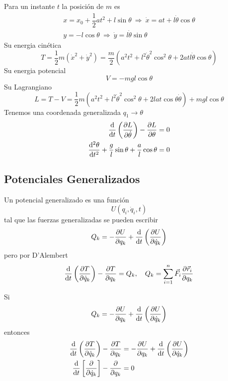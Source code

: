 \documentclass[../main]{subfiles}
\begin{document}
Para un instante $t$ la posición de $m$ es
\begin{align*}
    x=x_0+\dfrac{1}{2}at^2+l\sin \theta \ \Rightarrow \ \dot{x}=at+l\dot{\theta}\cos \theta \\
    y=-l\cos \theta \ \Rightarrow \ \dot{y}=l\dot{\theta}\sin \theta
\end{align*}
Su energia cinética
\begin{equation*}
    T=\dfrac{1}{2}m(\dot{x}^2+\dot{y}^2)=\dfrac{m}{2}(a^2t^2+l^2\dot{\theta}^2\cos^2 \theta+2atl\dot{\theta}\cos \theta)
\end{equation*}
Su energia potencial
\begin{equation*}
    V=-mgl\cos \theta
\end{equation*}
Su Lagrangiano
\begin{equation*}
    L=T-V=\dfrac{1}{2}m(a^2t^2+l^2\dot{\theta}^2\cos^2 \theta+2lat\cos \theta \dot{\theta})+mgl\cos \theta
\end{equation*}
Tenemos una coordenada generalizada $q_1 \rightarrow \theta$
\begin{align*}
    \dv{}{t}\left(\pdv{L}{\dot{\theta}}\right)-\pdv{L}{\theta}=0\\
    \dv{^2 \theta}{t^2}+\dfrac{g}{l}\sin \theta+\dfrac{a}{l}\cos \theta=0
\end{align*}

\subsection{Potenciales Generalizados}
Un potencial generalizado es una función
\begin{equation}
    U(q_i, \dot{q}_i, t)
\end{equation}
tal que las fuerzas generalizadas se pueden escribir
\begin{equation}
    Q_k=-\pdv{U}{q_k}+\dv{}{t}\left(\pdv{U}{\dot{q}_k}\right)
\end{equation}
pero por D'Alembert
\begin{equation}
    \dv{}{t}\left(\pdv{T}{\dot{q}_k}\right)-\pdv{T}{q_k}=Q_k, \quad Q_k=\sum_{i=1}^n \vec{F}_i \pdv{\vec{r}_i}{q_k}
\end{equation}

Si
\begin{equation*}
    Q_k=-\pdv{U}{q_k}+\dv{}{t}\left(\pdv{U}{\dot{q}_k}\right)
\end{equation*}
entonces
\begin{equation}
    \begin{split}
        \dv{}{t}\left(\pdv{T}{\dot{q}_k}\right)-\pdv{T}{q_k}&=-\pdv{U}{q_k}+\dv{}{t}\left(\pdv{U}{\dot{q}_k}\right)\\
        \dv{}{t}\left[\pdv{}{\dot{q}_k}(T-U)\right]-\pdv{}{q_k}(T-U)&=0
    \end{split}
\end{equation}
\end{document}

